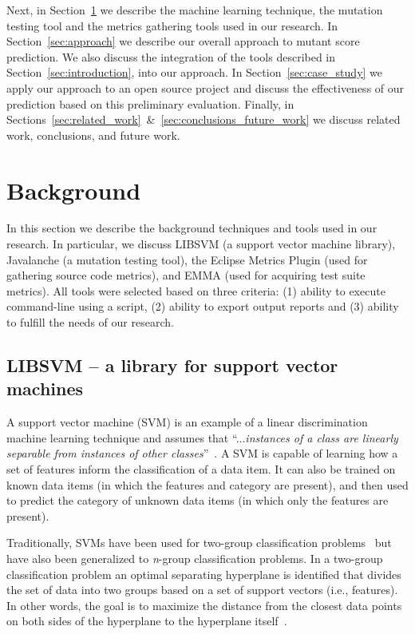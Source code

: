 \documentclass[conference]{IEEEtran}
\begin{document}
Next, in Section~\ref{sec:background} we describe the machine learning technique, the mutation testing tool and the metrics gathering tools used in our research. In Section~\ref{sec:approach} we describe our overall approach to mutant score prediction. We also discuss the integration of the tools described in Section~\ref{sec:introduction}, into our approach. In Section~\ref{sec:case_study} we apply our approach to an open source project and discuss the effectiveness of our prediction based on this preliminary evaluation. Finally, in Sections~\ref{sec:related_work}~\&~\ref{sec:conclusions_future_work} we discuss related work, conclusions, and future work.


\section{Background}
\label{sec:background}
In this section we describe the background techniques and tools used in our research. In particular, we discuss LIBSVM (a support vector machine library), Javalanche (a mutation testing tool), the Eclipse Metrics Plugin (used for gathering source code metrics), and EMMA (used for acquiring test suite metrics). All tools were selected based on three criteria: (1) ability to execute command-line using a script, (2) ability to export output reports and (3) ability to fulfill the needs of our research.


\subsection{LIBSVM -- a library for support vector machines}
\label{subsec:libsvm}
A support vector machine (SVM) is an example of a linear discrimination machine learning technique and assumes that ``...\emph{instances of a class are linearly separable from instances of other classes}''~\cite{ALP04}. A SVM is capable of learning how a set of features inform the classification of a data item. It can also be trained on known data items (in which the features and category are present), and then used to predict the category of  unknown data items (in which only the features are present).

Traditionally, SVMs have been used for two-group classification problems~\cite{CV95} but have also been generalized to \emph{n}-group classification problems. In a two-group classification problem an optimal separating hyperplane is identified that divides the set of data into two groups based on a set of support vectors (i.e., features). In other words, the goal is to maximize the distance from the closest data points on both sides of the hyperplane to the hyperplane itself~\cite{ALP04}.
\end{document}

